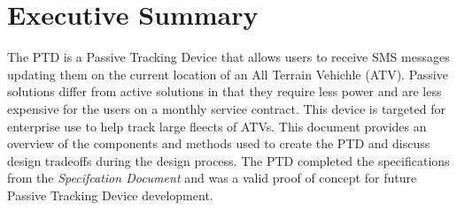\documentclass[11pt]{article}
\begin{document}
% 
%
%


\thispagestyle{empty}
\setcounter{tocdepth}{5}
\tableofcontents
\vspace{2cm}

\thispagestyle{empty}
\listoffigures
\pagebreak


\section{Executive Summary}
The PTD is a Passive Tracking Device that allows users to receive SMS messages updating them on the current location of an All Terrain Vehichle (ATV). Passive solutions differ
from active solutions in that they require less power and are less expensive for the users on a monthly service contract. This device is targeted for 
enterprise use to help track large fleects of ATVs. This document provides an overview of the components and methods used to create the PTD and discuss design tradeoffs during the design process. The PTD completed 
the specifications from the \textit{Specifcation Document} and was a valid proof of concept for future Passive Tracking Device development. 
\end{document}
